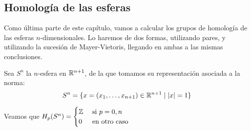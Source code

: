\subsection{Homología de las esferas}

Como última parte de este capítulo, vamos a calcular los grupos de homología de las esferas
$n$-dimensionales. Lo haremos de dos formas, utilizando pares, y utilizando la sucesión de
Mayer-Vietoris, llegando en ambas a las mismas conclusiones.

\begin{theorem}
  Sea $S^n$ la $n$-esfera en $\mathbb{R}^{n+1}$, de la que tomamos su representación asociada a la norma:
  \[S^n = \{x = (x_1, \dots, x_{n+1}) \in \mathbb{R}^{n+1} \mid |x| = 1\} \]

  Veamos que $H_p(S^n) = \begin{cases}  \mathbb{Z} & \text{ si } p = 0, n \\
                                         0 & \text{ en otro caso} \end{cases}$
\end{theorem}

